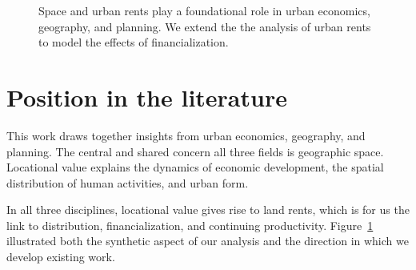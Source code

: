 \begin{figure}[!h]

\caption[Linking space and urban rents to the effects of financialization.]{Space and urban rents play a foundational role in urban economics, geography, and planning. We extend the the analysis of urban rents to model the effects of financialization.}
\label{fig-fields}
\end{figure}

\section{Position in the literature}
This work draws together insights from urban economics, geography, and planning. The central and shared concern all three fields is geographic space. Locational value explains the dynamics of economic development, the spatial distribution of human activities, and urban form.  

In all three disciplines, locational value gives rise to land rents, which is for us the link to distribution, financialization, and continuing productivity.  
Figure~\ref{fig-fields} illustrated both the synthetic aspect of our analysis and the direction in which we develop existing work. %

